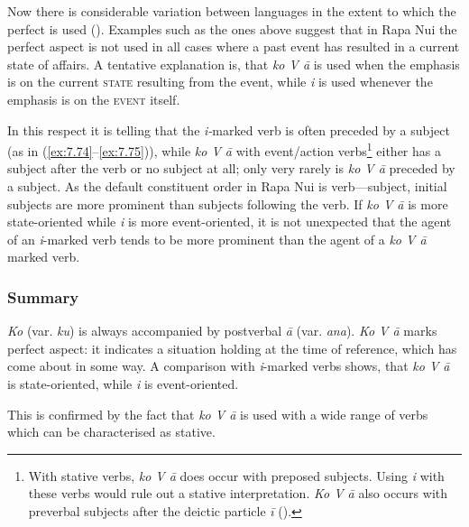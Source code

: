 Now there is considerable variation between languages in the extent to which the perfect is used (\citealt[52–56]{Comrie1976}). Examples such as the ones above suggest that in Rapa Nui the perfect aspect is not used in all cases where a past event has resulted in a current state of affairs. A tentative explanation is, that \textit{ko V {\ꞌ}ā} is used when the emphasis is on the current \textsc{state} resulting from the event, while \textit{i} is used whenever the emphasis is on the \textsc{event} itself. 

In this respect it is telling that the \textit{i-}marked verb is often preceded by a subject (as in (\ref{ex:7.74}–\ref{ex:7.75})), while \textit{ko V {\ꞌ}ā} with event/action verbs\footnote{\label{fn:336}With stative verbs, \textit{ko V {\ꞌ}ā} does occur with preposed subjects. Using \textit{i} with these verbs would rule out a stative interpretation. \textit{Ko V {\ꞌ}ā} also occurs with preverbal subjects after the deictic particle \textit{{\ꞌ}ī} ().} either has a subject after the verb or no subject at all; only very rarely is \textit{ko V {\ꞌ}ā} preceded by a subject. As the default constituent order in Rapa Nui is verb—subject, initial subjects are more prominent than subjects following the verb. If \textit{ko V {\ꞌ}ā} is more state-oriented while \textit{i} is more event-oriented, it is not unexpected that the agent of an \textit{i}{}-marked verb tends to be more prominent than the agent of a \textit{ko V {\ꞌ}ā} marked verb.

\subsubsection{Summary}\label{sec:7.2.7.5}

\textit{Ko} (var. \textit{ku}) is always accompanied by postverbal \textit{{\ꞌ}ā} (var. \textit{{\ꞌ}ana}). \textit{Ko V {\ꞌ}ā} marks perfect aspect: it indicates a situation holding at the time of reference, which has come about in some way. A comparison with \textit{i}{}-marked verbs shows, that \textit{ko V {\ꞌ}ā} is state-oriented, while \textit{i} is event-oriented. 

This is confirmed by the fact that \textit{ko V {\ꞌ}ā} is used with a wide range of verbs which can be characterised as stative.
 
